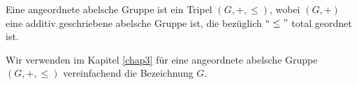 
%
\begin{defn} %
Eine angeordnete abelsche Gruppe ist ein Tripel $\left(G, +, \leq\right)$, wobei $\left(G, +\right)$ eine additiv geschriebene abelsche Gruppe ist, die bezüglich $``\leq "$ total geordnet ist.
\end{defn}
%
%
%
%
\begin{nota}
Wir verwenden im Kapitel \ref{chap3} für eine angeordnete abelsche Gruppe $\left(G, +, \leq\right)$ vereinfachend die Bezeichnung $G$.
\end{nota}

